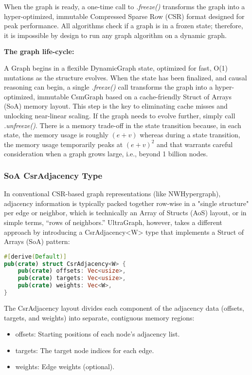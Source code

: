 When the graph is ready, a one-time  call to \textit{.freeze()} transforms the graph into a hyper-optimized, immutable Compressed Sparse Row (CSR) format designed for peak performance. All algorithms check if a graph is in a frozen state; therefore, it is impossible by design to run any graph algorithm on a dynamic graph. 

\textbf{The graph life-cycle:}

A Graph begins in a flexible DynamicGraph state, optimized for fast, O(1) mutations as the structure evolves. When the state has been finalized, and causal reasoning can begin, a single \textit{.freeze()} call transforms the graph into a hyper-optimized, immutable CsmGraph based on a cache-friendly Struct of Arrays (SoA) memory layout. This step is the key to eliminating cache misses and unlocking near-linear scaling. 
If the graph needs to evolve further, simply call \textit{.unfreeze()}. There is a memory trade-off in the state transition because, in each state, the memory usage is roughly $(e+v)$ whereas during a state transition, the memory usage temporarily peaks at $(e+v)^{2}$ and that warrants careful consideration when a graph grows large, i.e., beyond 1 billion nodes. 


\subsubsection{SoA CsrAdjacency Type}

In conventional CSR-based graph representations (like NWHypergraph), adjacency information is typically packed together row-wise in a "single structure" per edge or neighbor, which is technically an Array of Structs (AoS) layout, or in simple terms, “rows of neighbors.” UltraGraph, however, takes a different approach by introducing a CsrAdjacency<W> type that implements a Struct of Arrays (SoA) pattern:

\begin{lstlisting}[language=Rust, label={list:CsrAdjacency}, caption={UltraGraph: CsrAdjacency}]
#[derive(Default)]
pub(crate) struct CsrAdjacency<W> {
    pub(crate) offsets: Vec<usize>,
    pub(crate) targets: Vec<usize>,
    pub(crate) weights: Vec<W>,
}
\end{lstlisting}

\newpage

The CsrAdjacency layout divides each component of the adjacency data (offsets, targets, and weights) into separate, contiguous memory regions:

\begin{itemize}
\item offsets: Starting positions of each node’s adjacency list.
\item targets: The target node indices for each edge.
\item weights: Edge weights (optional).
\end{itemize}

